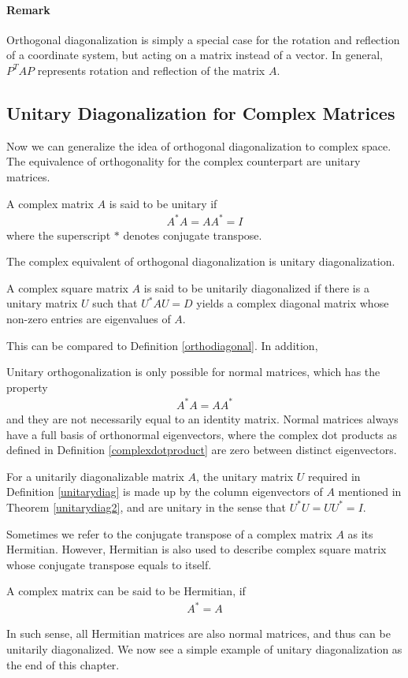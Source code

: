 \paragraph{Remark} Orthogonal diagonalization is simply a special case for the rotation and reflection of a coordinate system, but acting on a matrix instead of a vector. In general, $P^T AP$ represents rotation and reflection of the matrix $A$.

\subsection{Unitary Diagonalization for Complex Matrices} Now we can generalize the idea of orthogonal diagonalization to complex space. The equivalence of orthogonality for the complex counterpart are unitary matrices.
\begin{defn}
A complex matrix $A$ is said to be unitary if
\begin{align*}
A^*A = AA^* = I
\end{align*}
where the superscript $*$ denotes conjugate transpose.
\end{defn}
The complex equivalent of orthogonal diagonalization is unitary diagonalization.
\begin{defn}
\label{unitarydiag}
A complex square matrix $A$ is said to be unitarily diagonalized if there is a unitary matrix $U$ such that $U^* AU = D$ yields a complex diagonal matrix whose non-zero entries are eigenvalues of $A$.
\end{defn}
This can be compared to Definition \ref{orthodiagonal}. In addition,
\begin{thm}
\label{unitarydiag2}
Unitary orthogonalization is only possible for normal matrices, which has the property
\begin{align*}
A^*A = AA^*    
\end{align*}
and they are not necessarily equal to an identity matrix. Normal matrices always have a full basis of orthonormal eigenvectors, where the complex dot products as defined in Definition \ref{complexdotproduct} are zero between distinct eigenvectors.
\end{thm}
\begin{thm}
For a unitarily diagonalizable matrix $A$, the unitary matrix $U$ required in Definition \ref{unitarydiag} is made up by the column eigenvectors of $A$ mentioned in Theorem \ref{unitarydiag2}, and are unitary in the sense that $U^* U = UU^* = I$.
\end{thm}
Sometimes we refer to the conjugate transpose of a complex matrix $A$ as its Hermitian. However, Hermitian is also used to describe complex square matrix whose conjugate transpose equals to itself.
\begin{defn}
A complex matrix can be said to be Hermitian, if
\begin{align*}
A^* = A
\end{align*}
\end{defn}
In such sense, all Hermitian matrices are also normal matrices, and thus can be unitarily diagonalized. We now see a simple example of unitary diagonalization as the end of this chapter.

